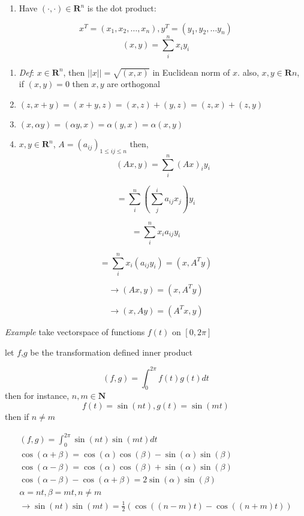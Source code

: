 \documentclass[
  12pt,
]{article}
\providecommand{\tightlist}{%
  \setlength{\itemsep}{0pt}\setlength{\parskip}{0pt}}
\begin{document}
\begin{enumerate}
\def\labelenumi{\arabic{enumi}.}
\tightlist
\item
  Have \((\cdot, \cdot) \in \mathbf{R}^n\) is the dot product:
\end{enumerate}

\[x^T = (x_1, x_2, …, x_n), y^T=(y_1, y_2, … y_n)\] \[(x, y) = \sum^n_{i} x_iy_i\]

\begin{enumerate}
\def\labelenumi{\arabic{enumi}.}
\setcounter{enumi}{1}
\item
  \emph{Def}: \(x\in \mathbf{R}^n\), then \(||x|| = \sqrt{(x, x)}\) in Euclidean norm of \(x\). also, \(x, y \in \mathbf{R}n\), if \((x, y) = 0\) then \(x, y\) are orthogonal
\item
  \((z, x+y) = (x+y, z) = (x, z) + (y,z) = (z, x) + (z, y)\)
\item
  \((x, \alpha y) = (\alpha y, x) = \alpha (y, x) = \alpha(x, y)\)
\item
  \(x, y \in \mathbf{R}^n\), \(A = (a_{ij})_{1\leq ij\leq n}\) then, \[(Ax, y) = \sum^n_i (Ax)_i y_i\]
\end{enumerate}

\[= \sum^n_i \left(\sum^i_j a_{ij}x_j\right)y_i\]

\[=\sum^n_i x_i a_{ij} y_i\]

\[= \sum^n_i x_i\left(a_{ij} y_i\right) = (x, A^Ty)\]

\[\rightarrow (Ax, y) = (x, A^Ty)\]

\[\rightarrow (x, Ay) = (A^Tx, y)\]

\emph{Example} take vectorspace of functions \(f(t)\) on \([0, 2\pi]\)

let \(f\),\(g\) be the transformation defined inner product

\[(f, g) = \int_0^{2\pi} f(t)g(t) dt\] then for instance, \(n, m \in \mathbf{N}\) \[f(t) = \sin(nt), g(t) = \sin(mt)\] then if \(n \neq m\)

\[
\begin{aligned}
(f,g) = \int_0^{2\pi} \sin(nt) \sin(mt) dt\\
\cos(\alpha + \beta) = \cos(\alpha) \cos(\beta) - \sin(\alpha) \sin(\beta) \\
\cos(\alpha - \beta) = \cos(\alpha) \cos(\beta) + \sin(\alpha) \sin(\beta) \\
\cos(\alpha-\beta)-\cos(\alpha+\beta) = 2\sin(\alpha)\sin(\beta) \\
\alpha = nt, \beta = mt, n\neq m \\
\rightarrow \sin(nt) \sin(mt) = \frac{1}{2}(\cos((n-m)t)-\cos((n+m)t))
\end{aligned}
\]
\end{document}
